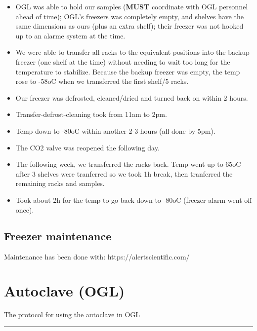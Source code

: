 \documentclass[
  letterpaper,
  DIV=11,
  numbers=noendperiod]{scrreprt}
\begin{document}
\begin{itemize}
\item
  OGL was able to hold our samples (\textbf{MUST} coordinate with OGL
  personnel ahead of time); OGL's freezers was completely empty, and
  shelves have the same dimensions as ours (plus an extra shelf); their
  freezer was not hooked up to an alarme system at the time.
\item
  We were able to transfer all racks to the equivalent positions into
  the backup freezer (one shelf at the time) without needing to wait too
  long for the temperature to stabilize. Because the backup freezer was
  empty, the temp rose to -58oC when we transferred the first shelf/5
  racks.
\item
  Our freezer was defrosted, cleaned/dried and turned back on within 2
  hours.
\item
  Transfer-defrost-cleaning took from 11am to 2pm.
\item
  Temp down to -80oC within another 2-3 hours (all done by 5pm).
\item
  The CO2 valve was reopened the following day.
\item
  The following week, we transferred the racks back. Temp went up to
  65oC after 3 shelves were tranferred so we took 1h break, then
  tranferred the remaining racks and samples.
\item
  Took about 2h for the temp to go back down to -80oC (freezer alarm
  went off once).
\end{itemize}

\hypertarget{freezer-maintenance}{%
\section*{\texorpdfstring{\textbf{Freezer
maintenance}}{Freezer maintenance}}\label{freezer-maintenance}}

Maintenance has been done with: https://alertscientific.com/

\hypertarget{autoclave-ogl}{%
\chapter{Autoclave (OGL)}\label{autoclave-ogl}}

The protocol for using the autoclave in OGL

\begin{center}\rule{0.5\linewidth}{0.5pt}\end{center}
\end{document}
